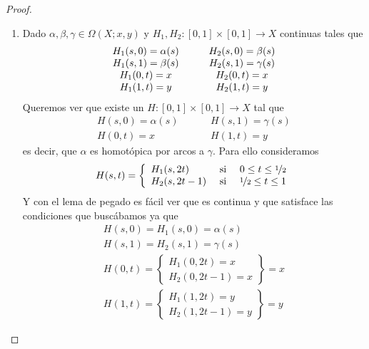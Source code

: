 \begin{lema}
\begin{proof}
\begin{enumerate}
            \item[(iii)] Dado $\alpha, \beta, \gamma\in \Omega(X;x,y)$ y $H_1,H_2:[0,1]\times[0,1]\to X$ continuas tales que 
            \begin{gather*}
                \begin{array}{c c c c}
                    H_1(s,0) = \alpha(s) &&& H_2(s,0) = \beta(s)\\
                    H_1(s,1) = \beta(s) &&& H_2(s,1) = \gamma(s)\\
                    H_1(0,t) = x &&& H_2(0,t) = x\\
                    H_1(1, t) = y &&& H_2(1,t) = y
                \end{array}
            \end{gather*}
            Queremos ver que existe un $H:[0,1]\times [0,1]\to X$ tal que 
            \begin{align*}
                H(s,0) = \alpha(s) \hspace{1cm} & H(s,1) = \gamma(s)\\
                H(0,t) = x \hspace{1cm} & H(1,t) = y
            \end{align*}
            es decir, que $\alpha$ es homotópica por arcos a $\gamma$. Para ello consideramos 
            \begin{gather*}
                H(s,t) = \left\{
                    \begin{array}{l c c}
                        H_1(s,2t) & \text{ si } & 0 \leq t \leq \nicefrac{1}{2}\\
                        H_2(s, 2t-1) & \text{ si } & \nicefrac{1}{2} \leq t \leq 1
                    \end{array}
                \right.
            \end{gather*}
            Y con el lema de pegado es fácil ver que es continua y que satisface las condiciones que buscábamos ya que 
            \begin{gather*}
                H(s,0)=H_1(s,0) = \alpha(s)\\
                H(s,1)=H_2(s,1) = \gamma(s)\\
                H(0,t) = \left\{
                \begin{array}{l}
                    H_1(0,2t) = x\\
                    H_2(0,2t-1) = x
                \end{array}
                \right\} = x\\
                H(1,t) = \left\{
                \begin{array}{l}
                    H_1(1,2t) = y\\
                    H_2(1,2t-1) = y
                \end{array}
                \right\} = y
            \end{gather*}
        \end{enumerate}
    \end{proof}
\end{lema}

